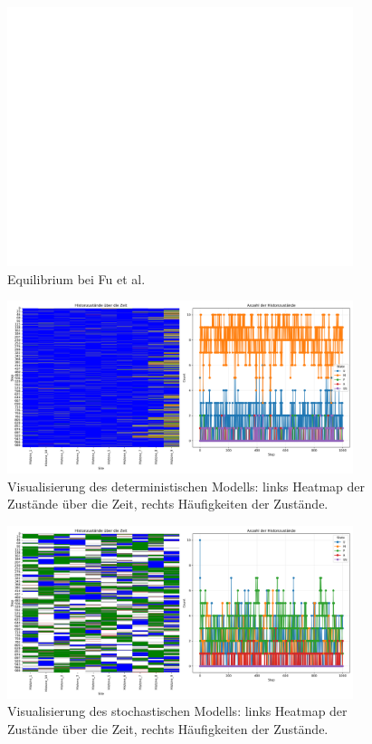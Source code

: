 \documentclass{SeminarV2}
\begin{document}
\begin{figure}[htbp]
  \centering
  \includegraphics[width=0.9\textwidth]{images/Fu_eq.png}
  \caption{Equilibrium bei Fu et al.}
  \label{fig:Fu_eq}
  \end{figure}

\begin{figure}[htbp]
\centering
\includegraphics[width=0.9\textwidth]{images/Histone_Prohaska_1000.png}
\caption{Visualisierung des deterministischen Modells: links Heatmap der Zustände über die Zeit, rechts Häufigkeiten der Zustände.}
\label{fig:P_1000}
\end{figure}

\begin{figure}[htbp]
\centering
\includegraphics[width=0.9\textwidth]{images/Histone_Markov_1000.png}
\caption{Visualisierung des stochastischen Modells: links Heatmap der Zustände über die Zeit, rechts Häufigkeiten der Zustände.}
\label{fig:M_1000}
\end{figure}
\end{document}
